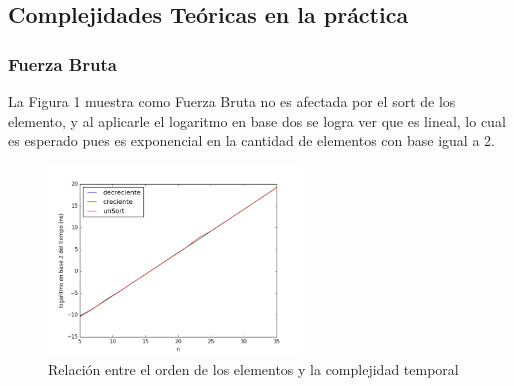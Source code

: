 \subsection{Complejidades Te\'oricas en la pr\'actica}
\subsubsection{Fuerza Bruta}
La Figura 1 muestra como Fuerza Bruta no es afectada por el sort de los elemento, y al aplicarle el logaritmo en base dos se logra ver que es lineal, lo cual es esperado pues es exponencial en la cantidad de elementos con base igual a 2.
\begin{figure}[h]
\centering
	\includegraphics[width=0.6\textwidth]{fbSort.png}
\caption{Relación entre el orden de los elementos y la complejidad temporal}
\end{figure}

